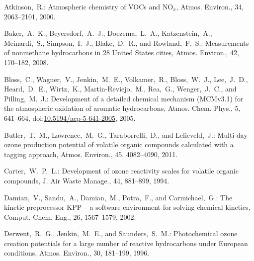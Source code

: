 \documentclass[acpd, online, hvmath]{copernicus}
\begin{document}
\begin{thebibliography}{34}

 Atkinson,~R.: {Atmospheric
    chemistry of VOCs and NO$_{x}$}, Atmos. Environ., 34,
  2063--2101, 2000.


 Baker,~A.~K.,
  Beyersdorf,~A.~J., Doezema,~L.~A., Katzenstein,~A., Meinardi,~S.,
  Simpson,~I.~J., Blake,~D.~R., and Rowland,~F.~S.: {Measurements of
    nonmethane hydrocarbons in 28 United States cities},
  Atmos. Environ., 42, 170--182, 2008.


 Bloss,~C., Wagner,~V., Jenkin,~M.~E.,
  Volkamer,~R., Bloss,~W.~J., Lee,~J.~D., Heard,~D.~E., Wirtz,~K.,
  Martin-Reviejo,~M., Rea,~G., Wenger,~J.~C., and Pilling,~M.~J.:
  Development of a detailed chemical mechanism (MCMv3.1) for the
  atmospheric oxidation of aromatic hydrocarbons, Atmos. Chem. Phys.,
  5, 641--664,
doi:\href{http://dx.doi.org/10.5194/acp-5-641-2005}{10.5194/acp-5-641-2005},
  2005.



 Butler,~T.~M., Lawrence,~M.~G.,
  Taraborrelli,~D., and Lelieveld,~J.: {Multi-day ozone production
    potential of volatile organic compounds calculated with a tagging
    approach}, Atmos. Environ., 45, 4082--4090, 2011.


 Carter,~W.~P.~L.: {Development
    of ozone reactivity scales for volatile organic compounds}, J. Air
  Waste Manage., 44, 881--899, 1994.


 Damian,~V., Sandu,~A., Damian,~M.,
  Potra,~F., and Carmichael,~G.: {The kinetic preprocessor KPP -- a
    software environment for solving chemical kinetics},
  Comput. Chem. Eng., 26, 1567--1579, 2002.


 Derwent,~R.~G., Jenkin,~M.~E., and
  Saunders,~S.~M.: {Photochemical ozone creation potentials for a
    large number of reactive hydrocarbons under European conditions},
  Atmos. Environ., 30, 181--199, 1996.



\end{thebibliography}
\end{document}
